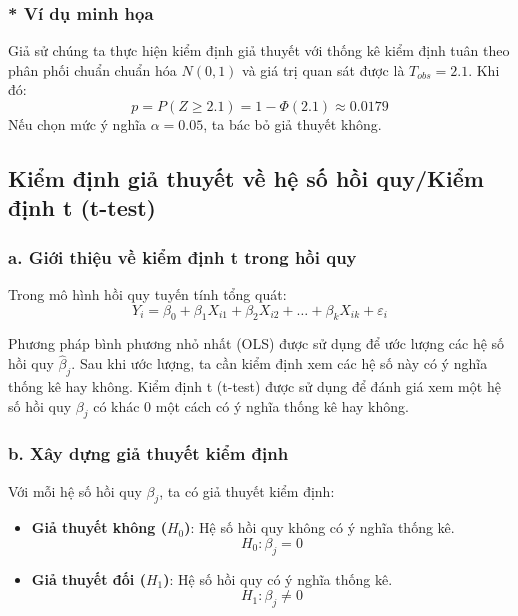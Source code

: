 \subsubsection{* Ví dụ minh họa}
Giả sử chúng ta thực hiện kiểm định giả thuyết với thống kê kiểm định tuân theo phân phối chuẩn chuẩn hóa $N(0,1)$ và giá trị quan sát được là $T_{obs} = 2.1$. Khi đó:
\begin{equation}
    p = P(Z \geq 2.1) = 1 - \Phi(2.1) \approx 0.0179
\end{equation}
Nếu chọn mức ý nghĩa $\alpha = 0.05$, ta bác bỏ giả thuyết không.


\subsection{Kiểm định giả thuyết về hệ số hồi quy/Kiểm định t (t-test)}
\subsubsection{a. Giới thiệu về kiểm định t trong hồi quy}

Trong mô hình hồi quy tuyến tính tổng quát:
\begin{equation}
    Y_i = \beta_0 + \beta_1 X_{i1} + \beta_2 X_{i2} + \dots + \beta_k X_{ik} + \varepsilon_i
\end{equation}

Phương pháp bình phương nhỏ nhất (OLS) được sử dụng để ước lượng các hệ số hồi quy $\hat{\beta}_j$. Sau khi ước lượng, ta cần kiểm định xem các hệ số này có ý nghĩa thống kê hay không. Kiểm định t (t-test) được sử dụng để đánh giá xem một hệ số hồi quy $\beta_j$ có khác 0 một cách có ý nghĩa thống kê hay không.

\subsubsection{b. Xây dựng giả thuyết kiểm định}

Với mỗi hệ số hồi quy $\beta_j$, ta có giả thuyết kiểm định:

\begin{itemize}
    \item \textbf{Giả thuyết không ($H_0$)}: Hệ số hồi quy không có ý nghĩa thống kê.
    \begin{equation}
        H_0: \beta_j = 0
    \end{equation}
    \item \textbf{Giả thuyết đối ($H_1$)}: Hệ số hồi quy có ý nghĩa thống kê.
    \begin{equation}
        H_1: \beta_j \neq 0
    \end{equation}
\end{itemize}

